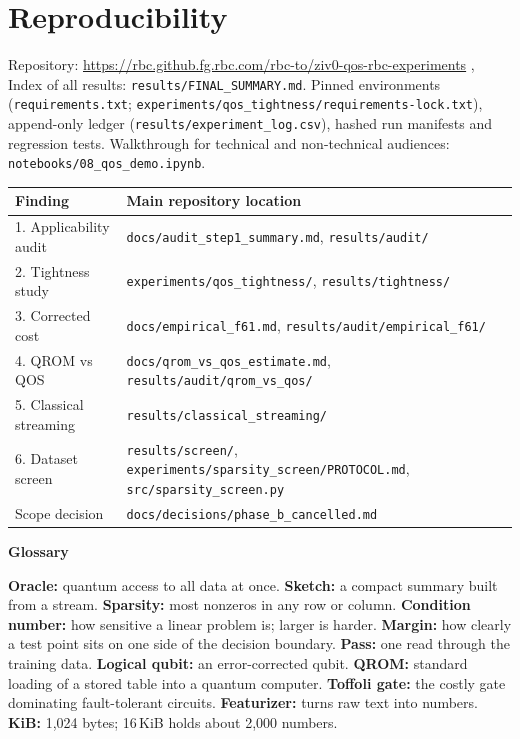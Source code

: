 \documentclass[10pt]{article}
\newcommand{\subhead}[1]{%
    \par
    \vspace{6pt}%
    \textbf{#1}%
    \par
    \vspace{2pt}%
}
\newenvironment{sectionblock}
{%
    \par
    \vspace{2pt}
    \noindent
    \begin{minipage}{\textwidth}
}
{%
    \end{minipage}
    \par
    \vspace{5pt}
}
\begin{document}
\begin{sectionblock}

\section{Reproducibility}
\label{sec:repro}

Repository: \url{https://rbc.github.fg.rbc.com/rbc-to/ziv0-qos-rbc-experiments} \cite{repo}, Index of all results: \texttt{results/FINAL\_SUMMARY.md}. Pinned environments (\texttt{requirements.txt}; \texttt{experiments/qos\_tightness/requirements-lock.txt}), append-only ledger (\texttt{results/experiment\_log.csv}), hashed run manifests and regression tests. Walkthrough for technical and non-technical audiences: \texttt{notebooks/08\_qos\_demo.ipynb}.

\vspace{2pt}
\begin{center}
\small
\begin{tabularx}{\textwidth}{@{}lY@{}}
\toprule
\textbf{Finding} & \textbf{Main repository location} \\
. Applicability audit & \texttt{docs/audit\_step1\_summary.md}, \texttt{results/audit/} \\
2. Tightness study & \texttt{experiments/qos\_tightness/}, \texttt{results/tightness/} \\
3. Corrected cost & \texttt{docs/empirical\_f61.md}, \texttt{results/audit/empirical\_f61/} \\
4. QROM vs QOS & \texttt{docs/qrom\_vs\_qos\_estimate.md}, \texttt{results/audit/qrom\_vs\_qos/} \\
5. Classical streaming & \texttt{results/classical\_streaming/} \\
6. Dataset screen & \texttt{results/screen/}, \texttt{experiments/sparsity\_screen/PROTOCOL.md}, \texttt{src/sparsity\_screen.py} \\
Scope decision & \texttt{docs/decisions/phase\_b\_cancelled.md} \\
\bottomrule
\end{tabularx}
\end{center}

\subhead{Glossary}
\textbf{Oracle:} quantum access to all data at once. \textbf{Sketch:} a compact summary built from a stream. \textbf{Sparsity:} most nonzeros in any row or column. \textbf{Condition number:} how sensitive a linear problem is; larger is harder. \textbf{Margin:} how clearly a test point sits on one side of the decision boundary. \textbf{Pass:} one read through the training data. \textbf{Logical qubit:} an error-corrected qubit. \textbf{QROM:} standard loading of a stored table into a quantum computer. \textbf{Toffoli gate:} the costly gate dominating fault-tolerant circuits. \textbf{Featurizer:} turns raw text into numbers. \textbf{KiB:} 1{,}024 bytes; 16\,KiB holds about 2{,}000 numbers.

\end{sectionblock}
\end{document}
